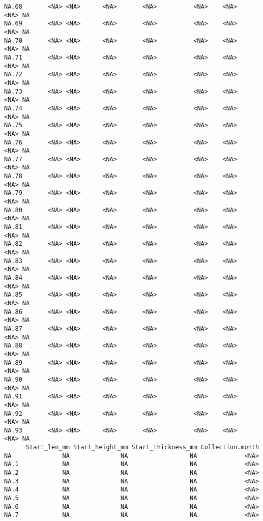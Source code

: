 \documentclass[
  letterpaper,
  DIV=11,
  numbers=noendperiod]{scrartcl}
\begin{document}
\begin{verbatim}
NA.68       <NA> <NA>      <NA>       <NA>          <NA>    <NA>    <NA> NA
NA.69       <NA> <NA>      <NA>       <NA>          <NA>    <NA>    <NA> NA
NA.70       <NA> <NA>      <NA>       <NA>          <NA>    <NA>    <NA> NA
NA.71       <NA> <NA>      <NA>       <NA>          <NA>    <NA>    <NA> NA
NA.72       <NA> <NA>      <NA>       <NA>          <NA>    <NA>    <NA> NA
NA.73       <NA> <NA>      <NA>       <NA>          <NA>    <NA>    <NA> NA
NA.74       <NA> <NA>      <NA>       <NA>          <NA>    <NA>    <NA> NA
NA.75       <NA> <NA>      <NA>       <NA>          <NA>    <NA>    <NA> NA
NA.76       <NA> <NA>      <NA>       <NA>          <NA>    <NA>    <NA> NA
NA.77       <NA> <NA>      <NA>       <NA>          <NA>    <NA>    <NA> NA
NA.78       <NA> <NA>      <NA>       <NA>          <NA>    <NA>    <NA> NA
NA.79       <NA> <NA>      <NA>       <NA>          <NA>    <NA>    <NA> NA
NA.80       <NA> <NA>      <NA>       <NA>          <NA>    <NA>    <NA> NA
NA.81       <NA> <NA>      <NA>       <NA>          <NA>    <NA>    <NA> NA
NA.82       <NA> <NA>      <NA>       <NA>          <NA>    <NA>    <NA> NA
NA.83       <NA> <NA>      <NA>       <NA>          <NA>    <NA>    <NA> NA
NA.84       <NA> <NA>      <NA>       <NA>          <NA>    <NA>    <NA> NA
NA.85       <NA> <NA>      <NA>       <NA>          <NA>    <NA>    <NA> NA
NA.86       <NA> <NA>      <NA>       <NA>          <NA>    <NA>    <NA> NA
NA.87       <NA> <NA>      <NA>       <NA>          <NA>    <NA>    <NA> NA
NA.88       <NA> <NA>      <NA>       <NA>          <NA>    <NA>    <NA> NA
NA.89       <NA> <NA>      <NA>       <NA>          <NA>    <NA>    <NA> NA
NA.90       <NA> <NA>      <NA>       <NA>          <NA>    <NA>    <NA> NA
NA.91       <NA> <NA>      <NA>       <NA>          <NA>    <NA>    <NA> NA
NA.92       <NA> <NA>      <NA>       <NA>          <NA>    <NA>    <NA> NA
NA.93       <NA> <NA>      <NA>       <NA>          <NA>    <NA>    <NA> NA
      Start_len_mm Start_height_mm Start_thickness_mm Collection.month
NA              NA              NA                 NA             <NA>
NA.1            NA              NA                 NA             <NA>
NA.2            NA              NA                 NA             <NA>
NA.3            NA              NA                 NA             <NA>
NA.4            NA              NA                 NA             <NA>
NA.5            NA              NA                 NA             <NA>
NA.6            NA              NA                 NA             <NA>
NA.7            NA              NA                 NA             <NA>

\end{verbatim}
\end{document}

